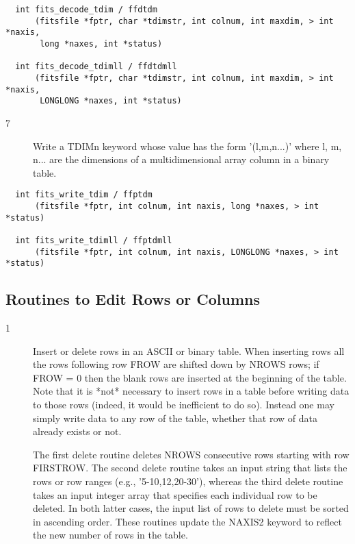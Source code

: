 \documentclass[11pt]{book}
\begin{document}
\begin{verbatim}
  int fits_decode_tdim / ffdtdm
      (fitsfile *fptr, char *tdimstr, int colnum, int maxdim, > int *naxis,
       long *naxes, int *status)

  int fits_decode_tdimll / ffdtdmll
      (fitsfile *fptr, char *tdimstr, int colnum, int maxdim, > int *naxis,
       LONGLONG *naxes, int *status)
\end{verbatim}

\begin{description}
\item[7 ] Write a TDIMn keyword whose value has the form '(l,m,n...)'
    where l, m, n... are the dimensions of a multidimensional array
   column in a binary table. \label{ffptdm}
\end{description}

\begin{verbatim}
  int fits_write_tdim / ffptdm
      (fitsfile *fptr, int colnum, int naxis, long *naxes, > int *status)

  int fits_write_tdimll / ffptdmll
      (fitsfile *fptr, int colnum, int naxis, LONGLONG *naxes, > int *status)
\end{verbatim}


\subsection{Routines to Edit Rows or Columns}


\begin{description}
\item[1 ] Insert or delete rows in an ASCII or binary table. When inserting rows
    all the rows following row FROW are shifted down by NROWS rows;  if
    FROW = 0 then the blank rows are inserted at the beginning of the
    table.  Note that it is *not* necessary to insert rows in a table before
    writing data to those rows (indeed, it would be inefficient to do so).
    Instead one may simply write data to any row of the table, whether that
    row of data already exists or not.

    The first delete routine deletes NROWS consecutive rows
    starting with row FIRSTROW.  The second delete routine takes an
    input string that lists the rows or row ranges (e.g.,
    '5-10,12,20-30'), whereas the third delete routine takes an input
    integer array that specifies each individual row to be deleted. In
    both latter cases, the input list of rows to delete must be sorted
    in ascending order.  These routines update the NAXIS2 keyword to
    reflect the new number of rows in the
   table. \label{ffirow} \label{ffdrow} \label{ffdrws} \label{ffdrrg}
\end{description}
\end{document}
